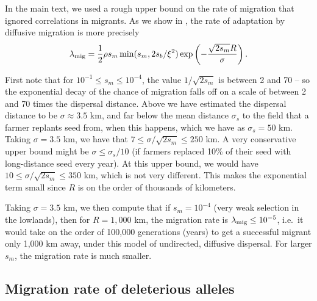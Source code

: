 In the main text, we used a rough upper bound on the rate of migration
that ignored correlations in migrants.
As we show in \citet{ralph2014convergent}, 
the rate of adaptation by diffusive migration is more precisely
\begin{align*}
  \lambda_{\text{mig}} = \frac{1}{2} \rho s_m \min(s_m,2s_b/\xi^2) \exp\left(- \frac{\sqrt{2 s_m}R}{\sigma} \right) .
\end{align*}


First note that for $10^{-1} \le s_m \le 10^{-4}$, the value $1/\sqrt{2s_m}$ is between 2 and 70 --
so the exponential decay of the chance of migration falls off on a scale of between 2 and 70 times the dispersal distance.
Above we have estimated the dispersal distance to be $\sigma \approx 3.5$ km,
and far below the mean distance $\sigma_s$ to the field that a farmer replants seed from, when this happens,
which we have as $\sigma_s = 50$ km.
Taking $\sigma=3.5$ km, we have that $7 \le \sigma/\sqrt{2s_m} \le 250$ km.
A very conservative upper bound might be $\sigma \le \sigma_s/10$ (if farmers replaced 10\% of their seed with long-distance seed every year).
At this upper bound, we would have $10 \le \sigma/\sqrt{2s_m} \le 350$ km,
which is not very different.
This makes the exponential term small since $R$ is on the order of thousands of kilometers.


Taking $\sigma=3.5$ km, we then compute that 
if $s_m = 10^{-4}$ (very weak selection in the lowlands), then for $R=1,000$ km, the migration rate is $\lambda_{\text{mig}} \le 10^{-5}$,
i.e.\ it would take on the order of 100,000 generations (years) to get a successful migrant only 1,000 km away,
under this model of undirected, diffusive dispersal.
For larger $s_m$, the migration rate is much smaller.


\subsection*{Migration rate of deleterious alleles}

